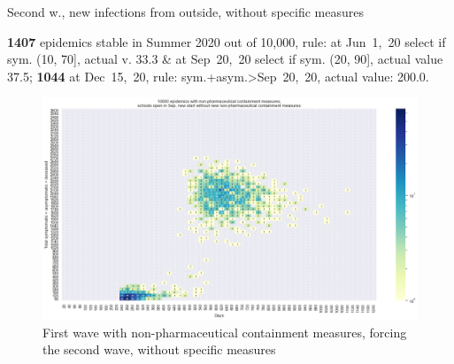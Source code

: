 \documentclass[8pt]{beamer}
\begin{document}
\begin{frame}{Second w., new infections from outside, without specific measures}


\textbf{1407} {\tiny epidemics stable in Summer 2020 out of 10,000, rule: at Jun~1,~20 select if sym. (10, 70], actual v. 33.3 \& at Sep~20,~20 select if sym. (20, 90], actual value 37.5;} \textbf{1044} {\tiny at Dec~15,~20, rule: sym.+asym.>Sep~20,~20, actual value: 200.0.}

\begin{figure}[H]
\center
\includegraphics[scale=0.17]{10kForceWave2.png}
\caption{First wave with non-pharmaceutical containment measures, forcing the second wave, without specific measures}
\label{selForceWave2}
\end{figure}



\end{frame}
\end{document}
